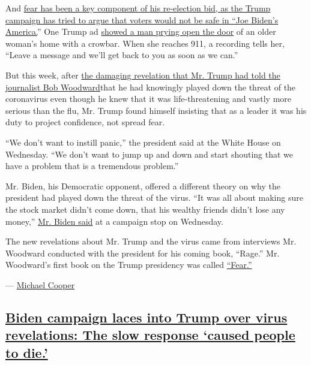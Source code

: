 And
\href{https://www.nytimes3xbfgragh.onion/2020/09/08/us/politics/trump-republicans-fear-strategy.html?referringSource=articleShare}{fear
has been a key component of his re-election bid, as the Trump campaign
has tried to argue that voters would not be safe in ``Joe Biden's
America.}'' One Trump ad
\href{https://www.youtube.com/watch?v=moZOrq0qL3Q}{showed a man prying
open the door} of an older woman's home with a crowbar. When she reaches
911, a recording tells her, ``Leave a message and we'll get back to you
as soon as we can.''

But this week, after
\href{https://www.nytimes3xbfgragh.onion/2020/09/09/us/politics/woodward-trump-book-virus.html}{the
damaging revelation that Mr. Trump had told the journalist Bob
Woodward}that he had knowingly played down the threat of the coronavirus
even though he knew that it was life-threatening and vastly more serious
than the flu, Mr. Trump found himself insisting that as a leader it was
his duty to project confidence, not spread fear.

``We don't want to instill panic,'' the president said at the White
House on Wednesday. ``We don't want to jump up and down and start
shouting that we have a problem that is a tremendous problem.''

Mr. Biden, his Democratic opponent, offered a different theory on why
the president had played down the threat of the virus. ``It was all
about making sure the stock market didn't come down, that his wealthy
friends didn't lose any money,''
\href{https://twitter.com/mkraju/status/1303811690371444750}{Mr. Biden
said} at a campaign stop on Wednesday.

The new revelations about Mr. Trump and the virus came from interviews
Mr. Woodward conducted with the president for his coming book, ``Rage.''
Mr. Woodward's first book on the Trump presidency was called
\href{https://www.nytimes3xbfgragh.onion/2018/09/05/books/review-fear-trump-in-white-house-bob-woodward.html}{``Fear.''}

--- \href{https://www.nytimes3xbfgragh.onion/by/michael-cooper}{Michael
Cooper}

\hypertarget{biden-campaign-laces-into-trump-over-virus-revelations-the-slow-response-caused-people-to-die}{%
\subsection{\texorpdfstring{\protect\hyperlink{biden-campaign-laces-into-trump-over-virus-revelations-the-slow-response-caused-people-to-die}{Biden
campaign laces into Trump over virus revelations: The slow response
`caused people to
die.'}}{Biden campaign laces into Trump over virus revelations: The slow response `caused people to die.'}}\label{biden-campaign-laces-into-trump-over-virus-revelations-the-slow-response-caused-people-to-die}}

